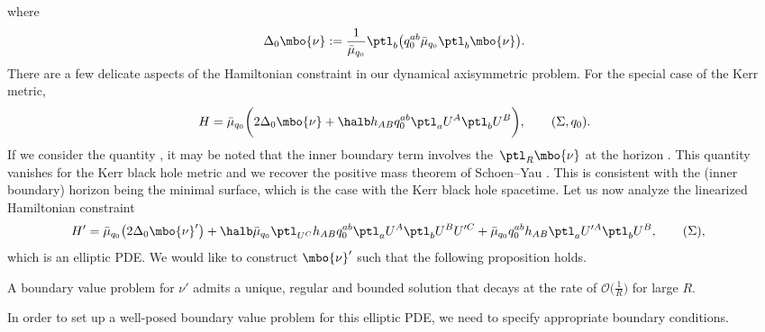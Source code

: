 where
\[
\Delta_0 \mbo{\nu} := \frac{1}{\bar{\mu}_{q_0}} \ptl_b\bigl(q^{ab}_0 \bar{\mu}_{q_0} \ptl_b \mbo{\nu}\bigr).
\]
There are a few delicate aspects of the Hamiltonian constraint in our dynamical axisymmetric problem. For the special case of the Kerr metric,
\begin{align*}
H = \bar{\mu}_{q_0} \biggl(2 \Delta_0 \mbo{\nu} + \halb h_{AB} q_0^{ab} \ptl_a U^A \ptl_b U^B\biggr), \qquad (\Sigma, q_0).
\end{align*}
If we consider the quantity , it may be noted that the inner boundary term involves the~$\ptl_R \mbo{\nu}$ at the horizon . This quantity vanishes for the Kerr black hole metric and we recover the positive mass theorem of Schoen--Yau \cite{schoen-yau-1, schoen-yau-2}. This is consistent with the (inner boundary) horizon being the minimal surface, which is the case with the Kerr black hole spacetime.
Let us now analyze the linearized Hamiltonian constraint
\begin{align*}
H' &{}= \bar{\mu}_{q_0} \bigl(2 \Delta_0 \mbo{\nu}'\bigr) + \halb \bar{\mu}_{q_0} \ptl_{U^C} h_{AB} q_0^{ab} \ptl_a U^A \ptl_b U^B U'^C + \bar{\mu}_{q_0} q_0^{ab} h_{AB} \ptl_a U'^A \ptl_b U^B, \qquad (\Sigma),
\end{align*}
which is an elliptic PDE.
We would like to construct $\mbo{\nu}'$ such that the following proposition holds.

\begin{Proposition} \label{well-posedness-nu'}
	A boundary value problem for $\nu'$ admits a unique, regular and bounded solution that decays at the rate of $\mathcal{O}\bigl(\frac{1}{R}\bigr)$ for large $R$.
\end{Proposition}

In order to set up a well-posed boundary value problem for this elliptic PDE, we need to specify appropriate boundary conditions.

